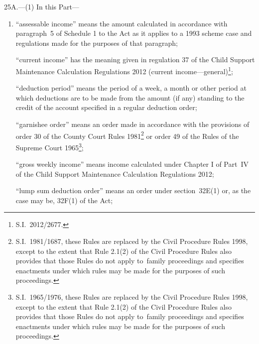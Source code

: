 \documentclass[12pt,a4paper]{article}
\begin{document}
25A.---(1)  In this Part—
\begin{enumerate}\item[]
“assessable income” means the amount calculated in accordance with paragraph~5 of Schedule 1 to the Act as it applies to a 1993 scheme case and regulations made for the purposes of that paragraph;

“current income” has the meaning given in regulation 37 of the Child Support Maintenance Calculation Regulations 2012 (current income---general)\footnote{S.I.~2012/2677.};

“deduction period” means the period of a week, a month or other period at which deductions are to be made from the amount (if any) standing to the credit of the account specified in a regular deduction order;

“garnishee order” means an order made in accordance with the provisions of order 30 of the County Court Rules 1981\footnote{S.I.~1981/1687, these Rules are replaced by the Civil Procedure Rules 1998, except to the extent that Rule 2.1(2) of the Civil Procedure Rules also provides that those Rules do not apply to~family proceedings and specifies enactments under which rules may be made for the purposes of such proceedings.} or order 49 of the Rules of the Supreme Court 1965\footnote{S.I.~1965/1976, these Rules are replaced by the Civil Procedure Rules 1998, except to the extent that Rule 2.1(2) of the Civil Procedure Rules also provides that those Rules do not apply to~family proceedings and specifies enactments under which rules may be made for the purposes of such proceedings.};

“gross weekly income” means income calculated under Chapter I of Part~IV of the Child Support Maintenance Calculation Regulations 2012;


“lump sum deduction order” means an order under section~32E(1) or, as the case may be, 32F(1) of the Act;


\end{enumerate}
\end{document}
